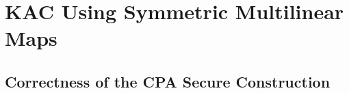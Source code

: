 % 
% 
% 
% 
% 
% 


\section{KAC Using Symmetric Multilinear Maps}

\subsection{Correctness of the CPA Secure Construction}
\label{app_sec:correctness_2}

